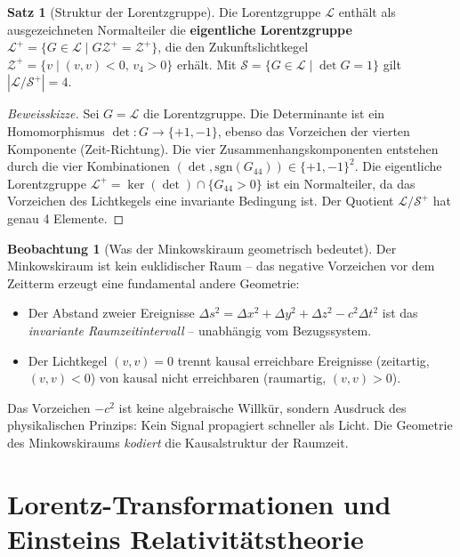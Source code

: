 ﻿\documentclass[a4paper,12pt]{report}
\theoremstyle{definition}
\newtheorem{satz}{Satz}
\newtheorem{beobachtung}{Beobachtung}
\begin{document}
\begin{satz}[Struktur der Lorentzgruppe]
    Die Lorentzgruppe $\mathcal{L}$ enthält als ausgezeichneten Normalteiler
    die \textbf{eigentliche Lorentzgruppe} $\mathcal{L}^+ = \{G \in \mathcal{L}
    \mid G \mathcal{Z}^+ = \mathcal{Z}^+\}$, die den Zukunftslichtkegel
    $\mathcal{Z}^+ = \{v \mid (v,v) < 0,\, v_4 > 0\}$ erhält.
    Mit $\mathcal{S} = \{G \in \mathcal{L} \mid \det G = 1\}$ gilt
    $|\mathcal{L}/\mathcal{S}^+| = 4$.
\end{satz}
\begin{proof}[Beweisskizze]
    Sei $G = \mathcal{L}$ die Lorentz\-gruppe. Die Determinante ist ein
    Homomorphismus $\det : G \to \{+1, -1\}$, ebenso das Vorzeichen
    der vierten Komponente (Zeit-Richtung). Die vier Zusammenhangskomponenten
    entstehen durch die vier Kombinationen
    $(\det, \mathrm{sgn}(G_{44})) \in \{+1,-1\}^2$.
    Die eigentliche Lorentzgruppe $\mathcal{L}^+ = \ker(\det) \cap \{G_{44} > 0\}$
    ist ein Normalteiler, da das Vorzeichen des Lichtkegels eine invariante
    Bedingung ist. Der Quotient $\mathcal{L}/\mathcal{S}^+$ hat genau
    4 Elemente.
\end{proof}


\begin{beobachtung}[Was der Minkowskiraum geometrisch bedeutet]
    Der Minkowskiraum ist kein euklidischer Raum -- das negative Vorzeichen
    vor dem Zeitterm erzeugt eine fundamental andere Geometrie:
    \begin{itemize}
        \item[-] Der Abstand zweier Ereignisse $\Delta s^2 = \Delta x^2 +
              \Delta y^2 + \Delta z^2 - c^2 \Delta t^2$ ist das
              \emph{invariante Raumzeitintervall} -- unabhängig vom
              Bezugssystem.
        \item[-] Der Lichtkegel $(v,v) = 0$ trennt kausal erreichbare
              Ereignisse (zeitartig, $(v,v) < 0$) von kausal nicht
              erreichbaren (raumartig, $(v,v) > 0$).
    \end{itemize}
    Das Vorzeichen $-c^2$ ist keine algebraische Willkür, sondern
    Ausdruck des physikalischen Prinzips: Kein Signal propagiert
    schneller als Licht. Die Geometrie des Minkowskiraums \emph{kodiert}
    die Kausalstruktur der Raumzeit.
\end{beobachtung}

\section{Lorentz-Transformationen und Einsteins Relativitätstheorie}
\end{document}
